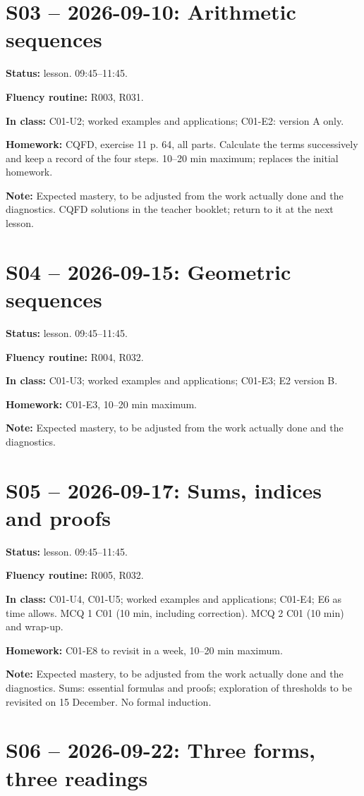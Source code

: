 \section*{S03 -- 2026-09-10: Arithmetic sequences}
\textbf{Status:} lesson. 09:45–11:45.\par\textbf{Fluency routine:} R003, R031.\par\textbf{In class:} C01-U2; worked examples and applications; C01-E2: version A only. \par\textbf{Homework:} CQFD, exercise 11 p. 64, all parts. Calculate the terms successively and keep a record of the four steps. 10–20 min maximum; replaces the initial homework.\par\textbf{Note:} Expected mastery, to be adjusted from the work actually done and the diagnostics. CQFD solutions in the teacher booklet; return to it at the next lesson.
\section*{S04 -- 2026-09-15: Geometric sequences}
\textbf{Status:} lesson. 09:45–11:45.\par\textbf{Fluency routine:} R004, R032.\par\textbf{In class:} C01-U3; worked examples and applications; C01-E3; E2 version B. \par\textbf{Homework:} C01-E3, 10–20 min maximum.\par\textbf{Note:} Expected mastery, to be adjusted from the work actually done and the diagnostics.
\section*{S05 -- 2026-09-17: Sums, indices and proofs}
\textbf{Status:} lesson. 09:45–11:45.\par\textbf{Fluency routine:} R005, R032.\par\textbf{In class:} C01-U4, C01-U5; worked examples and applications; C01-E4; E6 as time allows.  MCQ 1 C01 (10 min, including correction). MCQ 2 C01 (10 min) and wrap-up.\par\textbf{Homework:} C01-E8 to revisit in a week, 10–20 min maximum.\par\textbf{Note:} Expected mastery, to be adjusted from the work actually done and the diagnostics. Sums: essential formulas and proofs; exploration of thresholds to be revisited on 15 December. No formal induction.
\section*{S06 -- 2026-09-22: Three forms, three readings}
